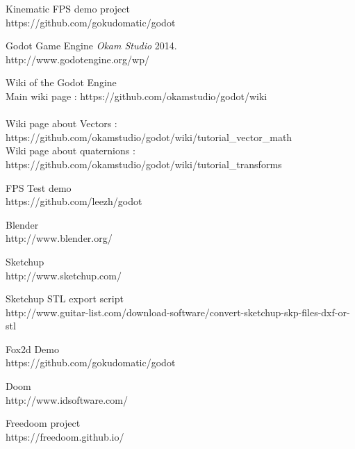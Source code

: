 \documentclass[10pt,a4paper]{article}
\begin{document}
\begin{thebibliography}{1}

 Kinematic FPS demo project\\
https://github.com/gokudomatic/godot

 Godot Game Engine {\em Okam Studio} 2014. \\
http://www.godotengine.org/wp/

 Wiki of the Godot Engine\\
Main wiki page : https://github.com/okamstudio/godot/wiki\\
\\
Wiki page about Vectors : https://github.com/okamstudio/godot/wiki/tutorial\_vector\_math\\
Wiki page about quaternions : https://github.com/okamstudio/godot/wiki/tutorial\_transforms

 FPS Test demo\\
https://github.com/leezh/godot

 Blender\\
http://www.blender.org/

 Sketchup\\
http://www.sketchup.com/

 Sketchup STL export script\\
http://www.guitar-list.com/download-software/convert-sketchup-skp-files-dxf-or-stl


 Fox2d Demo\\
https://github.com/gokudomatic/godot

 Doom\\
http://www.idsoftware.com/

 Freedoom project\\
https://freedoom.github.io/

\end{thebibliography}
\end{document}
